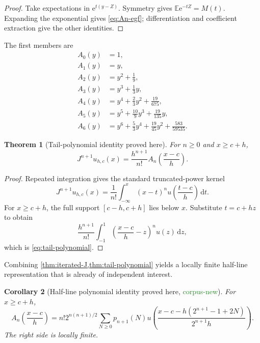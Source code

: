 \documentclass[11pt]{article}
\newtheorem{theorem}{Theorem}[section]
\newtheorem{corollary}[theorem]{Corollary}
\theoremstyle{definition}
\theoremstyle{remark}
\newcommand{\E}{\mathbb{E}}
\newcommand{\1}{\mathbf{1}}
\newcommand{\dd}{\,\mathrm{d}}
\newcommand{\e}{\mathrm{e}}
\newcommand{\CorpusNew}{\textcolor{ForestGreen}{\textsf{corpus-new}}}
\newcommand{\ProvedHere}{\textcolor{BrickRed}{\textsf{proved here}}}
\begin{document}
\begin{proof}
Take expectations in $\e^{t(y-Z)}$.  Symmetry gives
$\E\e^{-tZ}=M(t)$.  Expanding the exponential gives
\eqref{eq:An-egf}; differentiation and coefficient extraction give the other
identities.
\end{proof}

The first members are
\begin{align*}
 A_0(y)&=1,\\
 A_1(y)&=y,\\
 A_2(y)&=y^2+\frac19,\\
 A_3(y)&=y^3+\frac13y,\\
 A_4(y)&=y^4+\frac23y^2+\frac{19}{675},\\
 A_5(y)&=y^5+\frac{10}{9}y^3+\frac{19}{135}y,\\
 A_6(y)&=y^6+\frac53y^4+\frac{19}{45}y^2+\frac{583}{59535}.
\end{align*}

\begin{theorem}[Tail-polynomial identity \ProvedHere]
\label{thm:tail-polynomial}
For $n\geq0$ and $x\geq c+h$,
\begin{equation}
 J^{n+1}u_{h,c}(x)
 =\frac{h^{n+1}}{n!}
 A_n\!\left(\frac{x-c}{h}\right).
 \label{eq:tail-polynomial}
\end{equation}
\end{theorem}

\begin{proof}
Repeated integration gives the standard truncated-power kernel
\[
 J^{n+1}u_{h,c}(x)
 =\frac1{n!}\int_{-\infty}^{x}(x-t)^n
 u\!\left(\frac{t-c}{h}\right)\dd t.
\]
For $x\geq c+h$, the full support $[c-h,c+h]$ lies below $x$.  Substitute
$t=c+hz$ to obtain
\[
 \frac{h^{n+1}}{n!}
 \int_{-1}^{1}\left(\frac{x-c}{h}-z\right)^nu(z)\dd z,
\]
which is \eqref{eq:tail-polynomial}.
\end{proof}

Combining \cref{thm:iterated-J,thm:tail-polynomial} yields a locally finite
half-line representation that is already of independent interest.

\begin{corollary}[Half-line polynomial identity \ProvedHere, \CorpusNew]
\label{cor:halfline}
For $x\geq c+h$,
\begin{equation}
 A_n\!\left(\frac{x-c}{h}\right)
 =n!2^{n(n+1)/2}\sum_{N\geq0}p_{n+1}(N)
 u\!\left(
 \frac{x-c-h(2^{n+1}-1+2N)}{2^{n+1}h}
 \right).
 \label{eq:halfline}
\end{equation}
The right side is locally finite.
\end{corollary}
\end{document}
